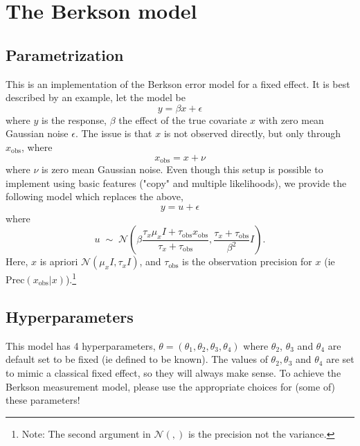 \documentclass[a4paper,11pt]{article}
\begin{document}
\section*{The Berkson model}

\subsection*{Parametrization}

This is an implementation of the Berkson error model for a fixed
effect. It is best described by an example, let  the model be
\begin{displaymath}
    y = \beta x + \epsilon{}
\end{displaymath}
where $y$ is the response, $\beta$ the effect of the true covariate
$x$ with zero mean Gaussian noise $\epsilon$. The issue is that $x$ is not observed
directly, but only through $x_{\text{obs}}$, where
\begin{displaymath}
    x_{\text{obs}} = x + \nu{}
\end{displaymath}
where $\nu$ is zero mean Gaussian noise. Even though this setup is
possible to implement using basic features ("copy" and multiple
likelihoods), we provide the following model which replaces the above,
\begin{displaymath}
    y = u + \epsilon{}
\end{displaymath}
where
\begin{displaymath}
    u \;\sim\;{\mathcal N}\left(
      \beta \frac{\tau_{x} \mu_{x} I + \tau_{\text{obs}} x_{\text{obs}}}{
          \tau_{x}+\tau_{\text{obs}}},
      \frac{\tau_{x} + \tau_{\text{obs}}}{\beta^{2}} I \right).
\end{displaymath}
Here, $x$ is apriori ${\mathcal N}(\mu_{x} {I}, \tau_{x} {I})$, and
$\tau_{\text{obs}}$ is the observation precision for $x$ (ie
$\text{Prec}(x_{\text{obs}}|x)$).\footnote{Note: The second argument in ${\mathcal
        N}(,)$ is the precision not the variance.}



\subsection*{Hyperparameters}

This model has 4 hyperparameters, $\theta = (\theta_{1}, \theta_{2},
\theta_{3}, \theta_{4})$ where $\theta_{2}$, $\theta_{3}$ and
$\theta_{4}$ are default set to be fixed (ie defined to be known). The
values of $\theta_{2}, \theta_{3}$ and $\theta_{4}$ are set to mimic a
classical fixed effect, so they will always make sense. To achieve the
Berkson measurement model, please use the appropriate choices for
(some of) these parameters!
\end{document}
